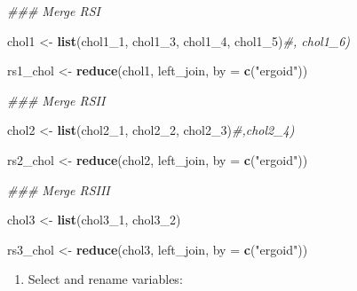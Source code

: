 \documentclass[]{book}
\newenvironment{Shaded}{\begin{snugshade}}{\end{snugshade}}
\newcommand{\CommentTok}[1]{\textcolor[rgb]{0.56,0.35,0.01}{\textit{#1}}}
\newcommand{\DataTypeTok}[1]{\textcolor[rgb]{0.13,0.29,0.53}{#1}}
\newcommand{\DecValTok}[1]{\textcolor[rgb]{0.00,0.00,0.81}{#1}}
\newcommand{\KeywordTok}[1]{\textcolor[rgb]{0.13,0.29,0.53}{\textbf{#1}}}
\newcommand{\NormalTok}[1]{#1}
\newcommand{\StringTok}[1]{\textcolor[rgb]{0.31,0.60,0.02}{#1}}
\providecommand{\tightlist}{%
  \setlength{\itemsep}{0pt}\setlength{\parskip}{0pt}}
\begin{document}
\begin{Shaded}
\begin{Highlighting}[]
\CommentTok{### Merge RSI}

\NormalTok{chol1 <-}\StringTok{ }\KeywordTok{list}\NormalTok{(chol1_}\DecValTok{1}\NormalTok{, chol1_}\DecValTok{3}\NormalTok{, chol1_}\DecValTok{4}\NormalTok{, chol1_}\DecValTok{5}\NormalTok{)}\CommentTok{#, chol1_6)}

\NormalTok{rs1_chol <-}\StringTok{ }\KeywordTok{reduce}\NormalTok{(chol1, left_join, }\DataTypeTok{by =} \KeywordTok{c}\NormalTok{(}\StringTok{"ergoid"}\NormalTok{))}

\CommentTok{### Merge RSII}

\NormalTok{chol2 <-}\StringTok{ }\KeywordTok{list}\NormalTok{(chol2_}\DecValTok{1}\NormalTok{, chol2_}\DecValTok{2}\NormalTok{, chol2_}\DecValTok{3}\NormalTok{)}\CommentTok{#,chol2_4)}

\NormalTok{rs2_chol <-}\StringTok{ }\KeywordTok{reduce}\NormalTok{(chol2, left_join, }\DataTypeTok{by =} \KeywordTok{c}\NormalTok{(}\StringTok{"ergoid"}\NormalTok{))}

\CommentTok{### Merge RSIII}

\NormalTok{chol3 <-}\StringTok{ }\KeywordTok{list}\NormalTok{(chol3_}\DecValTok{1}\NormalTok{, chol3_}\DecValTok{2}\NormalTok{)}

\NormalTok{rs3_chol <-}\StringTok{ }\KeywordTok{reduce}\NormalTok{(chol3, left_join, }\DataTypeTok{by =} \KeywordTok{c}\NormalTok{(}\StringTok{"ergoid"}\NormalTok{))}
\end{Highlighting}
\end{Shaded}

\begin{enumerate}
\def\labelenumi{\arabic{enumi}.}
\setcounter{enumi}{3}
\tightlist
\item
  Select and rename variables:
\end{enumerate}
\end{document}
